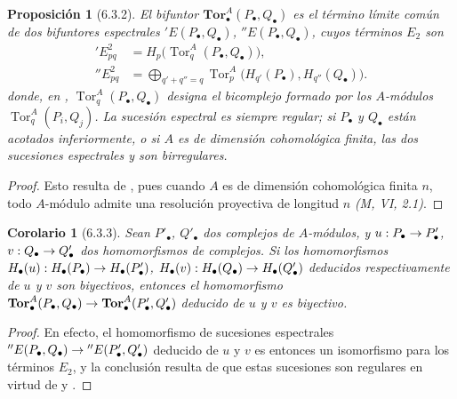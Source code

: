 \documentclass[10pt,oneside,openany]{book}
\theoremstyle{egaenv}\newtheorem*{env}{---}
\theoremstyle{egastatement}
\newtheorem*{proposition}{Proposición}
\newtheorem*{corollary}{Corolario}
\theoremstyle{egadescription}
\renewcommand{\to}{\mathchoice{\longrightarrow}{\rightarrow}{\rightarrow}{\rightarrow}}
\begin{document}
\begin{proposition}[6.3.2]
\label{III.6.3.2}
El bifuntor $\mathbf{Tor}_\bullet^A(P_\bullet,Q_\bullet)$ es el término
límite común de dos bifuntores espectrales
$'E(P_\bullet,Q_\bullet)$, $''E(P_\bullet,Q_\bullet)$, cuyos términos $E_2$
son
\begin{align}
  'E^2_{pq}
    &=H_p\bigl(\operatorname{Tor}_q^A(P_\bullet,Q_\bullet)\bigr),
    \tag{6.3.2.1}\label{III.6.3.2.1.fr}\\
  ''E^2_{pq}
    &=\bigoplus_{q'+q''=q}
      \operatorname{Tor}_p^A\bigl(H_{q'}(P_\bullet),H_{q''}(Q_\bullet)\bigr).
    \tag{6.3.2.2}\label{III.6.3.2.2.fr}
\end{align}
donde, en ,
$\operatorname{Tor}_q^A(P_\bullet,Q_\bullet)$ designa el
bicomplejo formado por los $A$-módulos $\operatorname{Tor}_q^A(P_i,Q_j)$. La
sucesión espectral  es siempre regular; si $P_\bullet$ y
$Q_\bullet$
están acotados inferiormente, o si $A$ es de dimensión cohomológica finita,
las dos sucesiones espectrales  y
 son birregulares.
\end{proposition}

\begin{proof}
Esto resulta de , pues cuando $A$ es de dimensión
cohomológica
finita $n$, todo $A$-módulo admite una resolución proyectiva de longitud $n$
\emph{(M, VI, 2.1)}.
\end{proof}

\begin{corollary}[6.3.3]
\label{III.6.3.3}
Sean $P'_\bullet$, $Q'_\bullet$ dos complejos de $A$-módulos, y
$u:P_\bullet\to P'_\bullet$, $v:Q_\bullet\to Q'_\bullet$ dos homomorfismos
de complejos. Si los homomorfismos
$H_\bullet(u):H_\bullet(P_\bullet)\to H_\bullet(P'_\bullet)$,
$H_\bullet(v):H_\bullet(Q_\bullet)\to H_\bullet(Q'_\bullet)$ deducidos
respectivamente de $u$ y $v$ son biyectivos, entonces el homomorfismo
$\mathbf{Tor}_\bullet^A(P_\bullet,Q_\bullet)\to
\mathbf{Tor}_\bullet^A(P'_\bullet,Q'_\bullet)$ deducido de $u$ y $v$ es
biyectivo.
\end{corollary}

\begin{proof}
En efecto, el homomorfismo de sucesiones espectrales
$''E(P_\bullet,Q_\bullet)\to''E(P'_\bullet,Q'_\bullet)$ deducido de $u$ y $v$
es entonces un isomorfismo para los términos $E_2$, y la conclusión resulta
de que estas sucesiones son regulares en virtud de  y
.
\end{proof}
\end{document}
